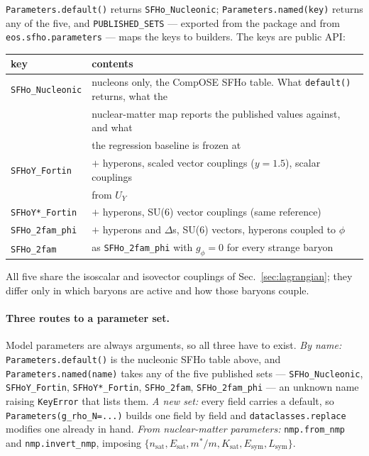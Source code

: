 \documentclass[aps,prc,onecolumn,superscriptaddress,nofootinbib,10pt]{revtex4-2}
\begin{document}
\texttt{Parameters.default()} returns \texttt{SFHo\_Nucleonic};
\texttt{Parameters.named(key)} returns any of the five, and
\texttt{PUBLISHED\_SETS} --- exported from the package and from
\texttt{eos.sfho.parameters} --- maps the keys to builders. The keys are
public API:
%
\begin{center}
\begin{tabular}{ll}
\toprule
key & contents \\
\midrule
\texttt{SFHo\_Nucleonic} & nucleons only, the CompOSE SFHo table. What
   \texttt{default()} returns, what the \\
 & nuclear-matter map reports the published values against, and what \\
 & the regression baseline is frozen at \\
\texttt{SFHoY\_Fortin} & $+$ hyperons, scaled vector couplings ($y = 1.5$),
   scalar couplings \\
 & from $U_Y$~\cite{Fortin2017} \\
\texttt{SFHoY*\_Fortin} & $+$ hyperons, SU(6) vector couplings (same
   reference) \\
\texttt{SFHo\_2fam\_phi} & $+$ hyperons and $\Delta$s, SU(6) vectors,
   hyperons coupled to $\phi$ \\
\texttt{SFHo\_2fam} & as \texttt{SFHo\_2fam\_phi} with $g_\phi = 0$ for every
   strange baryon \\
\bottomrule
\end{tabular}
\end{center}
%
All five share the isoscalar and isovector couplings of
Sec.~\ref{sec:lagrangian}; they differ only in which baryons are active and
how those baryons couple.

\paragraph{Three routes to a parameter set.} Model parameters are always
arguments, so all three have to exist. \emph{By name:}
\texttt{Parameters.default()} is the nucleonic SFHo table above, and
\texttt{Parameters.named(name)} takes any of the five published sets ---
\texttt{SFHo\_Nucleonic}, \texttt{SFHoY\_Fortin}, \texttt{SFHoY*\_Fortin},
\texttt{SFHo\_2fam}, \texttt{SFHo\_2fam\_phi} --- an unknown name raising
\texttt{KeyError} that lists them. \emph{A new set:} every field carries a
default, so \texttt{Parameters(g\_rho\_N=...)} builds one field by field and
\texttt{dataclasses.replace} modifies one already in hand. \emph{From
nuclear-matter parameters:} \texttt{nmp.from\_nmp} and
\texttt{nmp.invert\_nmp}, imposing $\{n_\mathrm{sat}, E_\mathrm{sat}, m^*/m,
K_\mathrm{sat}, E_\mathrm{sym}, L_\mathrm{sym}\}$.
\end{document}

